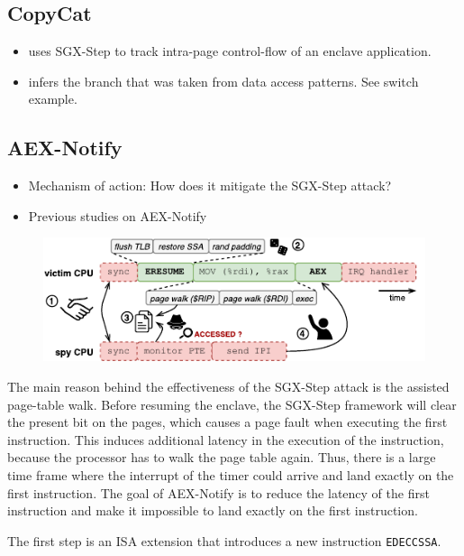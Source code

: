 \documentclass{llncs}
\begin{document}
\subsection{CopyCat}
\begin{itemize}
  \item uses SGX-Step to track intra-page control-flow of an enclave
    application.
  \item infers the branch that was taken from data access patterns. See switch
    example.
\end{itemize}

\subsection{AEX-Notify}
\begin{itemize}
  \item Mechanism of action: How does it mitigate the SGX-Step attack?
  \item Previous studies on AEX-Notify
\end{itemize}

\begin{figure}[t]
  \centering
  \includegraphics{images/sgx-step-pte.pdf}
  \caption{}
  \label{fig:sgx-step-pte}
\end{figure}

The main reason behind the effectiveness of the SGX-Step attack is the assisted
page-table walk.
Before resuming the enclave, the SGX-Step framework will clear the present bit
on the pages, which causes a page fault when executing the first instruction.
This induces additional latency in the execution of the instruction, because
the processor has to walk the page table again.
Thus, there is a large time frame where the interrupt of the timer could
arrive and land exactly on the first instruction.
The goal of AEX-Notify is to reduce the latency of the first instruction
and make it impossible to land exactly on the first instruction.

The first step is an ISA extension that introduces a new instruction \texttt{EDECCSSA}.
\end{document}
